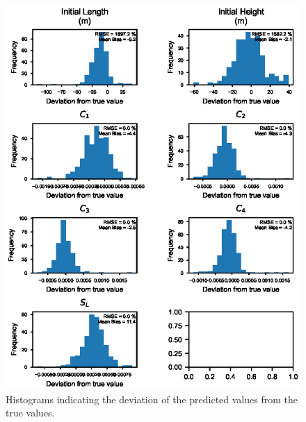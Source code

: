 \begin{figure}[t]
  \includegraphics[width=12cm]{fig08.eps}
  \caption{Histograms indicating the deviation of the predicted values from the true values.}
  \label{fig:test_histogram_deviation}
\end{figure}

